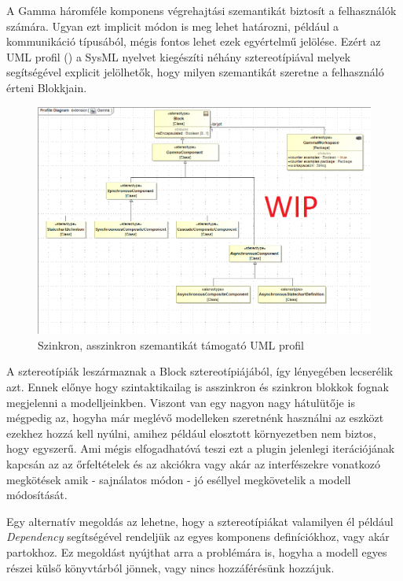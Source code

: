 A Gamma háromféle komponens végrehajtási szemantikát biztosít a felhasználók számára. Ugyan ezt implicit módon is meg lehet határozni, például a kommunikáció típusából, mégis fontos lehet ezek egyértelmű jelölése. Ezért az UML profil () a SysML nyelvet kiegészíti néhány sztereotípiával melyek segítségével explicit jelölhetők, hogy milyen szemantikát szeretne a felhasználó érteni Blokkjain.

\begin{figure}[!ht]
	\centering
	\includegraphics[width=150mm, keepaspectratio]{figures/contribution/profile.png}
	\caption{Szinkron, asszinkron szemantikát támogató UML profil}
	\label{fig:comp-prof}
\end{figure}

A sztereotípiák leszármaznak a Block sztereotípiájából, így lényegében lecserélik azt. Ennek előnye hogy szintaktikailag is asszinkron és szinkron blokkok fognak megjelenni a modelljeinkben. Viszont van egy nagyon nagy hátulütője is mégpedig az, hogyha már meglévő modelleken szeretnénk használni az eszközt ezekhez hozzá kell nyúlni, amihez például elosztott környezetben nem biztos, hogy egyszerű. Ami mégis elfogadhatóvá teszi ezt a plugin jelenlegi iterációjának kapcsán az az őrfeltételek és az akciókra vagy akár az interfészekre vonatkozó megkötések amik - sajnálatos módon - jó eséllyel megkövetelik a modell módosítását.

Egy alternatív megoldás az lehetne, hogy a sztereotípiákat valamilyen él például \emph{Dependency} segítségével rendeljük az egyes komponens definíciókhoz, vagy akár partokhoz. Ez megoldást nyújthat arra a problémára is, hogyha a modell egyes részei külső könyvtárból jönnek, vagy nincs hozzáférésünk hozzájuk.


